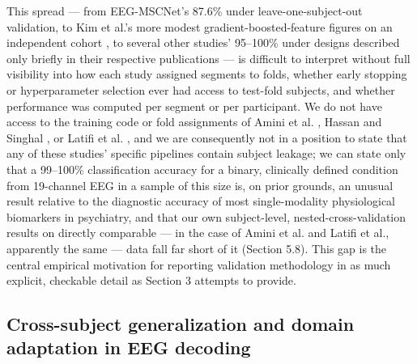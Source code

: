 \documentclass[a4paper,fleqn]{cas-sc}
\begin{document}
This spread --- from EEG-MSCNet's 87.6\% under leave-one-subject-out validation, to Kim et al.'s more modest gradient-boosted-feature figures on an independent cohort \cite{kim2025electroencephalogram}, to several other studies' 95--100\% under designs described only briefly in their respective publications \cite{amini2025adhdeepnet,hassan2024convolutional,esas2023detection,chen2019deep,latifi2024siamese} --- is difficult to interpret without full visibility into how each study assigned segments to folds, whether early stopping or hyperparameter selection ever had access to test-fold subjects, and whether performance was computed per segment or per participant. We do not have access to the training code or fold assignments of Amini et al. \cite{amini2025adhdeepnet}, Hassan and Singhal \cite{hassan2024convolutional}, or Latifi et al. \cite{latifi2024siamese}, and we are consequently not in a position to state that any of these studies' specific pipelines contain subject leakage; we can state only that a 99--100\% classification accuracy for a binary, clinically defined condition from 19-channel EEG in a sample of this size is, on prior grounds, an unusual result relative to the diagnostic accuracy of most single-modality physiological biomarkers in psychiatry, and that our own subject-level, nested-cross-validation results on directly comparable --- in the case of Amini et al. and Latifi et al., apparently the same --- data fall far short of it (Section 5.8). This gap is the central empirical motivation for reporting validation methodology in as much explicit, checkable detail as Section 3 attempts to provide.



\subsection{Cross-subject generalization and domain adaptation in EEG decoding}
\end{document}
